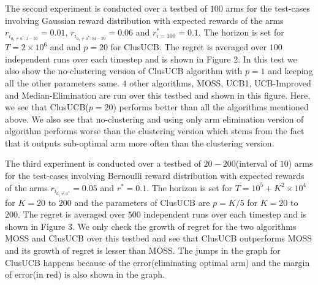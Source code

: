 The second experiment is conducted over a testbed of $100$ arms for the test-cases involving Gaussian reward distribution with expected rewards of the arms $r_{i_{a_{i}\neq a^{*}:1-33}}=0.01$, $r_{i_{a_{i}\neq a^{*}:34-99}}=0.06$ and $r^{*}_{i=100}=0.1$. The horizon is set for $T=2\times 10^{6}$ and and $p=20$ for ClusUCB. The regret is averaged over $100$ independent runs over each timestep and is shown in Figure 2. In this test we also show the no-clustering version of ClusUCB algorithm with $p=1$ and keeping all the other parameters same. $4$ other algorithms, MOSS, UCB1, UCB-Improved and Median-Elimination are run over this testbed and shown in this figure. Here, we see that ClusUCB($p=20$) performs better than all the algorithms mentioned above. We also see that no-clustering and using only arm elimination version of algorithm performs worse than the clustering version which stems from the fact that it outputs sub-optimal arm more often than the clustering version.

The third experiment is conducted over a testbed of $20-200$(interval of $10$) arms for the test-cases involving Bernoulli reward distribution with expected rewards of the arms $r_{i_{a_{i}\neq a^{*}}}=0.05$ and $r^{*}=0.1$. The horizon is set for $T=10^{5} + K^{2}\times 10^{4}$ for $K=20$ to $200$ and the parameters of ClusUCB are $p=K/5$ for $K=20$ to $200$. The regret is averaged over $500$ independent runs over each timestep and is shown in Figure 3. We only check the growth of regret for the two algorithms MOSS and ClusUCB over this testbed and see that ClusUCB outperforms MOSS and its growth of regret is lesser than MOSS. The jumps in the graph for ClusUCB happens because of the error(eliminating optimal arm) and the margin of error(in red) is also shown in the graph. 
